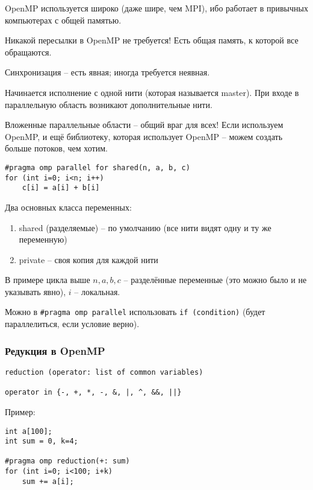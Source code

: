\documentclass[main.tex]{subfiles}
\begin{document}
OpenMP используется широко (даже шире, чем MPI), ибо работает в привычных компьютерах с общей памятью.

Никакой пересылки в OpenMP не требуется! Есть общая память, к которой все обращаются.

Синхронизация -- есть явная; иногда требуется неявная.

Начинается исполнение с одной нити (которая называется master).
При входе в параллельную область возникают дополнительные нити.

Вложенные параллельные области -- общий враг для всех!
Если используем OpenMP, и ещё библиотеку, которая использует OpenMP -- можем создать больше потоков, чем хотим.

\begin{verbatim}
#pragma omp parallel for shared(n, a, b, c)
for (int i=0; i<n; i++)
    c[i] = a[i] + b[i]
\end{verbatim}

Два основных класса переменных:

\begin{enumerate}[noitemsep]
	\item shared (разделяемые) -- по умолчанию (все нити видят одну и ту же переменную)
	\item private -- своя копия для каждой нити
\end{enumerate}

В примере цикла выше $ n, a, b, c $ -- разделённые переменные (это можно было и не указывать явно), $ i $ -- локальная. 

Можно в \texttt{\#pragma omp parallel} использовать \texttt{if (condition)} (будет параллелиться, если условие верно).

\subsubsection{Редукция в OpenMP}

\begin{verbatim}
reduction (operator: list of common variables)

operator in {-, +, *, -, &, |, ^, &&, ||}
\end{verbatim}

Пример:

\begin{verbatim}
int a[100];
int sum = 0, k=4;

#pragma omp reduction(+: sum)
for (int i=0; i<100; i+k)
    sum += a[i];
\end{verbatim}
\end{document}
